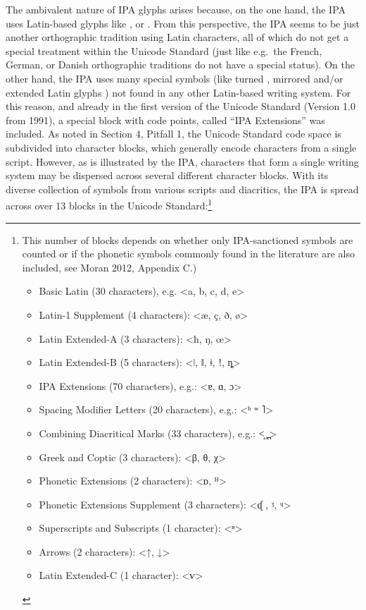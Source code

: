 {{{{{{{{{{{{{{{{{{{{{{{{{{{{{{{{The ambivalent nature of IPA glyphs arises because, on the one hand, the IPA uses Latin-based glyphs like , or . From this perspective, the IPA seems to be just another orthographic tradition using Latin characters, all of which do not get a special treatment within the Unicode Standard (just like e.g.~the French, German, or Danish orthographic traditions do not have a special status). On the other hand, the IPA uses many special symbols (like turned , mirrored and/or extended Latin glyphs ) not found in any other Latin-based writing system. For this reason, and already in the first version of the Unicode Standard (Version 1.0 from 1991), a special block with code points, called ``IPA Extensions'' was included. As noted in Section 4, Pitfall 1, the Unicode Standard code space is subdivided into character blocks, which generally encode characters from a single script. However, as is illustrated by the IPA, characters that form a single writing system may be dispersed across several different character blocks. With its diverse collection of symbols from various scripts and diacritics, the IPA is spread across over 13 blocks in the Unicode Standard:\footnote{This number of blocks depends on whether only IPA-sanctioned symbols are counted or if the phonetic symbols commonly found in the literature are also included, see Moran 2012, Appendix C.)
\begin{itemize}
	\item Basic Latin (30 characters), e.g. <a, b, c, d, e> 
	\item Latin-1 Supplement (4 characters): <æ, ç, ð, ø\textgreater{} 
	\item Latin Extended-A (3 characters): <ħ, ŋ, œ> 
	\item Latin Extended-B (5 characters): <ǀ, ǁ, ǂ, ǃ, ȵ> 
	\item IPA Extensions (70 characters), e.g.: <ɐ, ɑ, ɔ> 
	\item Spacing Modifier Letters (20 characters), e.g.: <ʰ ʷ ˥> 
	\item Combining Diacritical Marks (33 characters), e.g.: <̝ ̥ ̪> 
	\item Greek and Coptic (3 characters): <β, θ, χ> 
	\item Phonetic Extensions (2 characters): <ᴅ, ᴴ> 
	\item Phonetic Extensions Supplement (3 characters): <ᶑ , ᶾ, ᶣ> 
	\item Superscripts and Subscripts (1 character): <ⁿ> 
	\item Arrows (2 characters): \textless{}↑, ↓\textgreater{} 
	\item Latin Extended-C (1 character): <ⱱ> 
\end{itemize}

}}}}}}}}}}}}}}}}}}}}}}}}}}}}}}}}}
